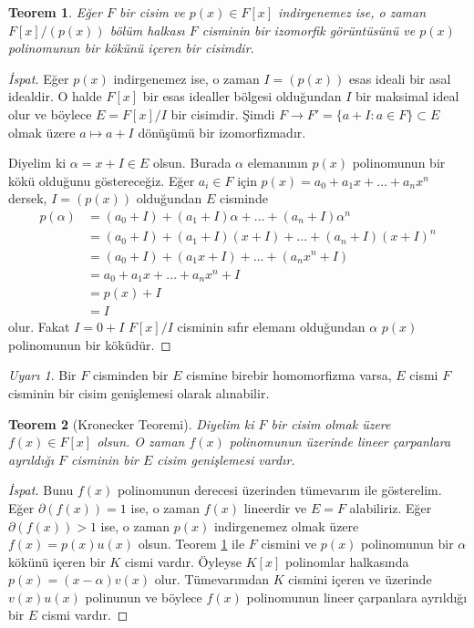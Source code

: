 \documentclass{article}
\newtheorem{thm}{Teorem}[section]
\theoremstyle{definition}
\theoremstyle{remark}
\newtheorem{rem}{Uyarı}[section]
\begin{document}
			\begin{thm}\label{3.6}
			    Eğer $F$ bir cisim ve $p(x) \in F[x]$ indirgenemez ise, o zaman $F[x]/(p(x))$ bölüm halkası $F$ cisminin bir izomorfik görüntüsünü ve $p(x)$ polinomunun bir kökünü içeren bir cisimdir.
			\end{thm}
			
			\begin{proof}[İspat]
			    Eğer $p(x)$ indirgenemez ise, o zaman $I = (p(x))$ esas ideali bir asal idealdir. O halde $F[x]$ bir esas idealler bölgesi olduğundan $I$ bir maksimal ideal olur ve böylece $E = F[x]/I$ bir cisimdir. Şimdi $F \to F' = \{a + I : a \in F\} \subset E$ olmak üzere $a \mapsto a + I$ dönüşümü bir izomorfizmadır.\par
			    Diyelim ki $\alpha = x + I \in E$ olsun. Burada $\alpha$ elemanının $p(x)$ polinomunun bir kökü olduğunu göstereceğiz. Eğer $a_i \in F$ için $p(x) = a_0 + a_1x + \dots + a_nx^n$ dersek, $I = (p(x))$ olduğundan $E$ cisminde
				\begin{align*}
					p(\alpha) &= (a_0 + I) + (a_1 + I)\alpha + \dots + (a_n + I)\alpha^n\\
					&= (a_0 + I) + (a_1 + I)(x + I) + \dots + (a_n + I)(x + I)^n\\
					&= (a_0 + I) + (a_1x + I) + \dots + (a_nx^n + I)\\
					&= a_0 + a_1x + \dots + a_nx^n + I\\
					&= p(x) + I\\
					&= I
				\end{align*}
				olur. Fakat $I = 0 + I$ $F[x]/I$ cisminin sıfır elemanı olduğundan $\alpha$ $p(x)$ polinomunun bir köküdür.
			\end{proof}
			
			\begin{rem}
			    Bir $F$ cisminden bir $E$ cismine birebir homomorfizma varsa, $E$ cismi $F$ cisminin bir cisim genişlemesi olarak alınabilir.
			\end{rem}
			
			\begin{thm}[Kronecker Teoremi]\label{3.7}
			    Diyelim ki $F$ bir cisim olmak üzere $f(x) \in F[x]$ olsun. O zaman $f(x)$ polinomunun üzerinde lineer çarpanlara ayrıldığı $F$ cisminin bir $E$ cisim genişlemesi vardır.
			\end{thm}
			
			\begin{proof}[İspat]
			    Bunu $f(x)$ polinomunun derecesi üzerinden tümevarım ile gösterelim. Eğer $\partial(f(x)) = 1$ ise, o zaman $f(x)$ lineerdir ve $E = F$ alabiliriz. Eğer $\partial(f(x)) > 1$ ise, o zaman $p(x)$ indirgenemez olmak üzere $f(x) = p(x)u(x)$ olsun. Teorem \ref{3.6} ile $F$ cismini ve $p(x)$ polinomunun bir $\alpha$ kökünü içeren bir $K$ cismi vardır. Öyleyse $K[x]$ polinomlar halkasında $p(x) = (x - \alpha)v(x)$ olur. Tümevarımdan $K$ cismini içeren ve üzerinde $v(x)u(x)$ polinunun ve böylece $f(x)$ polinomunun lineer çarpanlara ayrıldığı bir $E$ cismi vardır.
			\end{proof}
			
\end{document}
